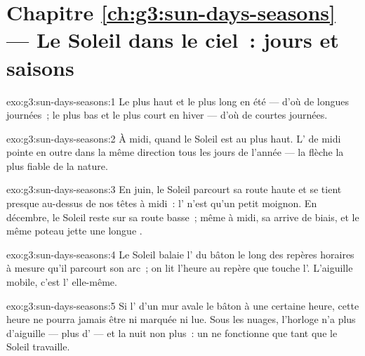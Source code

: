 \section*{Chapitre \ref{ch:g3:sun-days-seasons} --- Le Soleil dans le ciel~: jours et saisons}

\begin{solution}{exo:g3:sun-days-seasons:1}
Le plus haut et le plus long en été --- d'où de longues journées~; le
plus bas et le plus court en hiver --- d'où de courtes journées.
\end{solution}

\begin{solution}{exo:g3:sun-days-seasons:2}
À midi, quand le Soleil est au plus haut. L' de midi pointe en
outre dans la même direction tous les jours de l'année --- la flèche
la plus fiable de la nature.
\end{solution}

\begin{solution}{exo:g3:sun-days-seasons:3}
En juin, le Soleil parcourt sa route haute et se tient presque
au-dessus de nos têtes à midi~: l' n'est qu'un petit moignon. En
décembre, le Soleil reste sur sa route basse~; même à midi, sa
 arrive de biais, et le même poteau jette une longue .
\end{solution}

\begin{solution}{exo:g3:sun-days-seasons:4}
Le Soleil balaie l' du bâton le long des repères horaires à
mesure qu'il parcourt son arc~; on lit l'heure au repère que touche
l'. L'aiguille mobile, c'est l' elle-même.
\end{solution}

\begin{solution}{exo:g3:sun-days-seasons:5}
Si l' d'un mur avale le bâton à une certaine heure, cette heure
ne pourra jamais être ni marquée ni lue. Sous les nuages, l'horloge
n'a plus d'aiguille --- plus d' --- et la nuit non plus~: un
 ne fonctionne que tant que le Soleil travaille.
\end{solution}

